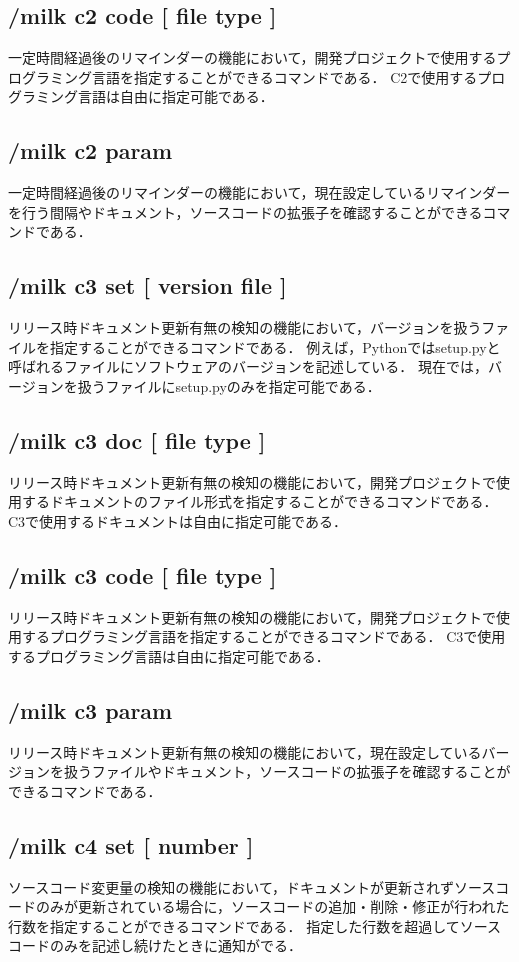 \subsection*{/milk c2 code [ file type ]}
一定時間経過後のリマインダーの機能において，開発プロジェクトで使用するプログラミング言語を指定することができるコマンドである．
C2で使用するプログラミング言語は自由に指定可能である．

\subsection*{/milk c2 param}
一定時間経過後のリマインダーの機能において，現在設定しているリマインダーを行う間隔やドキュメント，ソースコードの拡張子を確認することができるコマンドである．

\subsection*{/milk c3 set [ version file ]}
リリース時ドキュメント更新有無の検知の機能において，バージョンを扱うファイルを指定することができるコマンドである．
例えば，Pythonではsetup.pyと呼ばれるファイルにソフトウェアのバージョンを記述している．
現在では，バージョンを扱うファイルにsetup.pyのみを指定可能である．

\subsection*{/milk c3 doc [ file type ]}
リリース時ドキュメント更新有無の検知の機能において，開発プロジェクトで使用するドキュメントのファイル形式を指定することができるコマンドである．
C3で使用するドキュメントは自由に指定可能である．

\subsection*{/milk c3 code [ file type ]}
リリース時ドキュメント更新有無の検知の機能において，開発プロジェクトで使用するプログラミング言語を指定することができるコマンドである．
C3で使用するプログラミング言語は自由に指定可能である．

\subsection*{/milk c3 param}
リリース時ドキュメント更新有無の検知の機能において，現在設定しているバージョンを扱うファイルやドキュメント，ソースコードの拡張子を確認することができるコマンドである．

\subsection*{/milk c4 set [ number ]}
ソースコード変更量の検知の機能において，ドキュメントが更新されずソースコードのみが更新されている場合に，ソースコードの追加・削除・修正が行われた行数を指定することができるコマンドである．
指定した行数を超過してソースコードのみを記述し続けたときに通知がでる．

